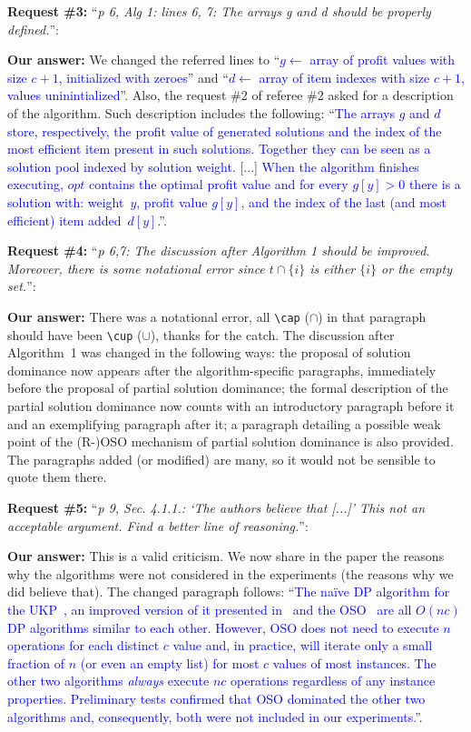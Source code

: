 \documentclass{elsarticle}
\begin{document}
\textbf{Request \#3:} ``\textit{p 6, Alg 1: lines 6, 7: The arrays g and d should be properly defined.}'':

\textbf{Our answer:} We changed the referred lines to ``\textcolor{blue}{\(g \leftarrow\) array of profit values with size \(c + 1\), initialized with zeroes}'' and ``\textcolor{blue}{\(d \leftarrow\) array of item indexes with size \(c + 1\), values uninintialized}''.
Also, the request \#2 of referee \#2 asked for a description of the algorithm.
Such description includes the following: ``\textcolor{blue}{The arrays \(g\) and \(d\) store, respectively, the profit value of generated solutions and the index of the most efficient item present in such solutions. Together they can be seen as a solution pool indexed by solution weight.} [...] \textcolor{blue}{When the algorithm finishes executing, \(opt\) contains the optimal profit value and for every \(g[y] > 0\) there is a solution with: weight~\(y\), profit value \(g[y]\), and the index of the last (and most efficient) item added~\(d[y]\).}''.
\bigskip

\textbf{Request \#4:} ``\textit{p 6,7: The discussion after Algorithm 1 should be improved. Moreover, there is some notational error since \(t \cap \{i\}\)  is either \(\{i\}\) or the empty set.}'':

\textbf{Our answer:} There was a notational error, all \verb+\cap+ (\(\cap\)) in that paragraph should have been \verb+\cup+ (\(\cup\)), thanks for the catch. The discussion after Algorithm~1 was changed in the following ways: the proposal of solution dominance now appears after the algorithm-specific paragraphs, immediately before the proposal of partial solution dominance; the formal description of the partial solution dominance now counts with an introductory paragraph before it and an exemplifying paragraph after it; a paragraph detailing a possible weak point of the (R-)OSO mechanism of partial solution dominance is also provided. The paragraphs added (or modified) are many, so it would not be sensible to quote them there.
\bigskip

\textbf{Request \#5:} ``\textit{p 9, Sec. 4.1.1.: `The authors believe that [...]' This not an acceptable argument. Find a better line of reasoning.}'':

\textbf{Our answer:} This is a valid criticism.
We now share in the paper the reasons why the algorithms were not considered in the experiments (the reasons why we did believe that).
The changed paragraph follows: ``\textcolor{blue}{The naïve DP algorithm for the UKP~\cite[p.~311]{tchu}, an improved version of it presented in~\cite[p.~221]{garfinkel} and the OSO~\cite[p.~15]{gg-66} are all \(O(nc)\) DP algorithms similar to each other. %
However, OSO does not need to execute \(n\) operations for each distinct \(c\) value and, in practice, will iterate only a small fraction of \(n\) (or even an empty list) for most \(c\) values of most instances.
The other two algorithms \emph{always} execute \(nc\) operations regardless of any instance properties.
Preliminary tests confirmed that OSO dominated the other two algorithms and, consequently, both were not included in our experiments.}''.
\bigskip
\end{document}

